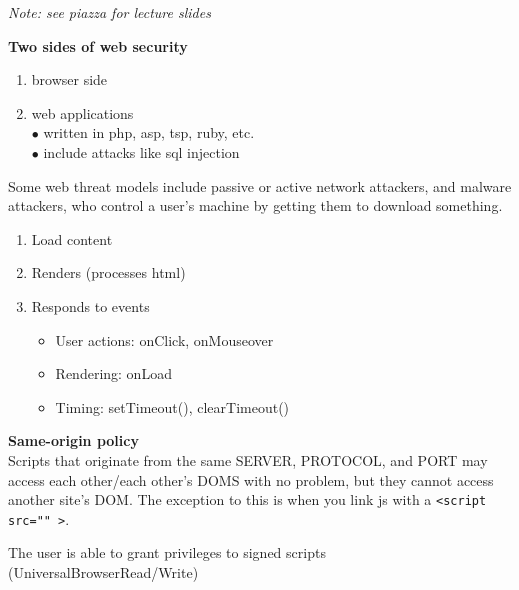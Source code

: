 \textit{Note: see piazza for lecture slides}

\textbf{Two sides of web security}
\begin{enumerate}
	\item browser side
	\item web applications\\
		\hspace*{1cm} $\bullet$ written in php, asp, tsp, ruby, etc.\\
		\hspace*{1cm} $\bullet$ include attacks like sql injection
\end{enumerate}

Some web threat models include passive or active network attackers, and malware attackers, who control a user's machine by getting them to download something.

\begin{enumerate}
	\item Load content
	\item Renders (processes html)
	\item Responds to events
		\begin{itemize}
			\item User actions: onClick, onMouseover
			\item Rendering: onLoad
			\item Timing: setTimeout(), clearTimeout()\\
		\end{itemize}
\end{enumerate}


\textbf{Same-origin policy}\\
Scripts that originate from the same SERVER, PROTOCOL, and PORT may access each other/each other's DOMS with no problem, but they cannot access another site's DOM. The exception to this is when you link js with a \texttt{<script src="" >}.

The user is able to grant privileges to signed scripts (UniversalBrowserRead/Write)

